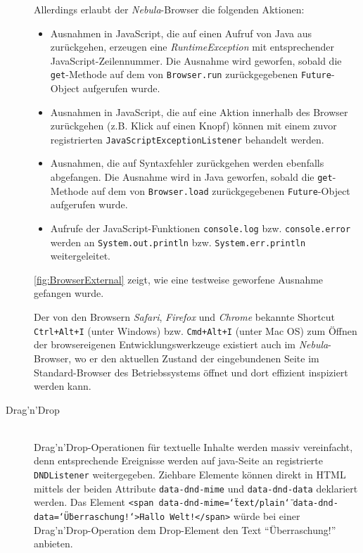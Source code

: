 \begin{description}
  Allerdings erlaubt der \textit{Nebula}-Browser die folgenden Aktionen:
  \begin{itemize}
  	\item Ausnahmen in JavaScript, die auf einen Aufruf von Java aus zurückgehen, erzeugen eine \textit{RuntimeException} mit entsprechender JavaScript-Zeilennummer. Die Ausnahme wird geworfen, sobald die \texttt{get}-Methode auf dem von \texttt{Browser.run} zurückgegebenen \texttt{Future}-Object aufgerufen wurde.
  	\item Ausnahmen in JavaScript, die auf eine Aktion innerhalb des Browser zurückgehen (z.B. Klick auf einen Knopf) können mit einem zuvor registrierten \texttt{JavaScriptExceptionListener} behandelt werden.
  	\item Ausnahmen, die auf Syntaxfehler zurückgehen werden ebenfalls abgefangen. Die Ausnahme wird in Java geworfen, sobald die \texttt{get}-Methode auf dem von \texttt{Browser.load} zurückgegebenen \texttt{Future}-Object aufgerufen wurde.
  	\item Aufrufe der JavaScript-Funktionen \texttt{console.log} bzw. \texttt{console.error} werden an \texttt{System.out.println} bzw. \texttt{System.err.println} weitergeleitet.
  \end{itemize}
  
  \autoref{fig:BrowserExternal} zeigt, wie eine testweise geworfene Ausnahme gefangen wurde.
  
  Der von den Browsern \textit{Safari}, \textit{Firefox} und \textit{Chrome} bekannte Shortcut \texttt{Ctrl+Alt+I} (unter Windows) bzw. \texttt{Cmd+Alt+I} (unter Mac OS) zum Öffnen der browsereigenen Entwicklungswerkzeuge existiert auch im \textit{Nebula}-Browser, wo er den aktuellen Zustand der eingebundenen Seite im Standard-Browser des Betriebssystems öffnet und dort effizient inspiziert werden kann.
  
  \item[Drag'n'Drop] \hfill \\
  Drag'n'Drop-Operationen für textuelle Inhalte werden massiv vereinfacht, denn entsprechende Ereignisse werden auf \gls{java}-Seite an registrierte \texttt{DNDListener} weitergegeben. Ziehbare Elemente können direkt in HTML mittels der beiden Attribute \texttt{data-dnd-mime} und \texttt{data-dnd-data} deklariert werden. Das Element \texttt{<span data-dnd-mime=\char`\"text/plain\char`\"} \texttt{data-dnd-data=\char`\"Überraschung!\char`\">Hallo Welt!</span>} würde bei einer Drag'n'Drop-Operation dem Drop-Element den Text ``Überraschung!'' anbieten.
  

\end{description}
